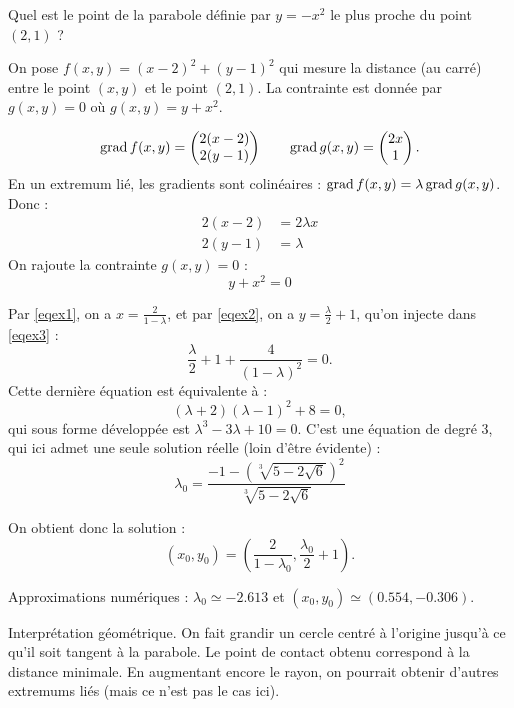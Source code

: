 \documentclass[11pt, class=report,crop=false]{standalone}
\begin{document}
\begin{exemple}
Quel est le point de la parabole définie par $y = -x^2$ le plus proche du point $(2,1)$ ?



On pose $f(x,y) = (x-2)^2+(y-1)^2$ qui mesure la distance (au carré) entre le point $(x,y)$ et le point $(2,1)$. La contrainte est donnée par 
$g(x,y) = 0$ où $g(x,y) = y+x^2$. 

$$\operatorname{grad} f(x,y) = \begin{pmatrix} 2(x-2) \\ 2(y-1) \end{pmatrix}
\qquad \operatorname{grad} g(x,y) = \begin{pmatrix} 2x \\ 1 \end{pmatrix}.$$
En un extremum lié, les gradients sont colinéaires : $\operatorname{grad} f(x,y) = \lambda \operatorname{grad} g(x,y)$. Donc :
\setcounter{equation}{0}
\begin{align}
2(x-2) &= 2\lambda x  \label{eqexx1}\\
2(y-1) &= \lambda \label{eqexx2}
\end{align}
On rajoute la contrainte $g(x,y) = 0$ :
\begin{equation}
y+x^2 = 0
\label{eqexx3}
\end{equation}

Par \eqref{eqex1}, on a $x = \frac{2}{1-\lambda}$, et par \eqref{eqex2}, on a $y = \frac\lambda2+1$, qu'on injecte dans \eqref{eqex3} :
$$\frac\lambda2+1 + \frac{4}{(1-\lambda)^2} = 0.$$
Cette dernière équation est équivalente à :
$$(\lambda+2) (\lambda-1)^2 + 8 =0,$$
qui sous forme développée est $\lambda^3-3\lambda+10=0$.
C'est une équation de degré $3$, qui ici admet une seule solution réelle (loin d'être évidente) :
$$\lambda_0 = \frac{-1-\left(\sqrt[3]{5-2\sqrt6}\right)^2}{\sqrt[3]{5-2\sqrt6}}$$

On obtient donc la solution :
$$(x_0,y_0) = \left( \frac{2}{1-\lambda_0},  \frac{\lambda_0}2+1 \right).$$




Approximations numériques :  $\lambda_0 \simeq -2.613$ et $(x_0,y_0) \simeq (0.554,-0.306)$.

Interprétation géométrique. On fait grandir un cercle centré à l'origine jusqu'à ce qu'il soit tangent à la parabole. Le point de contact obtenu correspond à la distance minimale. En augmentant encore le rayon, on pourrait obtenir d'autres extremums liés (mais ce n'est pas le cas ici).  



\end{exemple}
\end{document}

